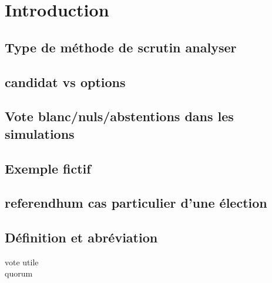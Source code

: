 \documentclass[../report]{subfiles}
\begin{document}
  \chapter{Introduction}

  \section{Type de méthode de scrutin analyser}
  \section{candidat vs options}
  \section{Vote blanc/nuls/abstentions dans les simulations}
  \section{Exemple fictif}
  \section{referendhum cas particulier d'une élection}

  \section{Définition et abréviation}
  
  \begin{description}
    \item[vote utile] 
    \item[quorum]
  \end{description}

\end{document}
